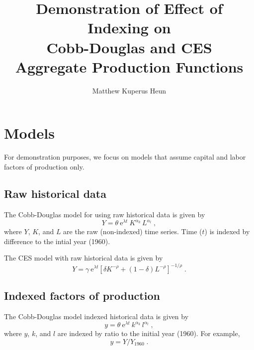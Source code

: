 \documentclass{article}\usepackage[]{graphicx}\usepackage[]{color}
\begin{document}
\title{Demonstration of Effect of Indexing on\\
Cobb-Douglas and CES\\
Aggregate Production Functions}
\author{Matthew Kuperus Heun}
\maketitle



\section{Models} 
\label{sec:models}

For demonstration purposes, 
we focus on models that assume capital and labor factors of production only.


\subsection{Raw historical data} 
\label{sec:raw}

The Cobb-Douglas model for using raw historical data is given by 
%
\begin{equation} \label{eq:CD_model_nonindexed}
  Y = \theta \: \mathrm{e}^{\lambda t} \: K^{\alpha_k} \, L^{\alpha_l} \; ,
\end{equation}
%
where $Y$, $K$, and $L$ are the raw (non-indexed) time series.
Time ($t$) is indexed by difference to the intial year (1960).

The CES model with raw historical data is given by
%
\begin{equation} \label{eq:CESkl_nonindexed}
  Y = \gamma \: \mathrm{e}^{\lambda t} \left[\delta K^{-\rho}
      + (1-\delta)L^{-\rho} \right]^{-1/\rho} \; .
\end{equation}


\subsection{Indexed factors of production} 
\label{sec:indexed}

The Cobb-Douglas model indexed historical data is given by
%
\begin{equation} \label{eq:CD_model}
  y = \theta \: \mathrm{e}^{\lambda t} \: k^{\alpha_k} \, l^{\alpha_l} \; ,
\end{equation}
%
where $y$, $k$, and $l$ are indexed by ratio to the initial year (1960). 
For example,
%
\begin{equation} \label{eq:indexing}
  y = Y/Y_{1960} \; .
\end{equation}
\end{document}
